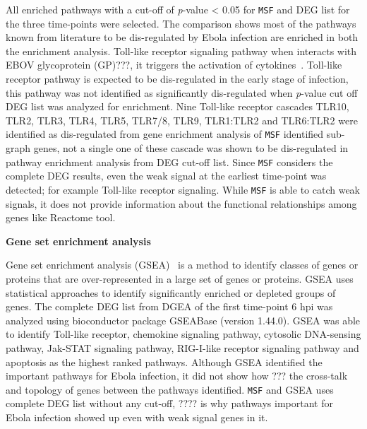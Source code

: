 \documentclass[10pt,a4paper,twocolumn]{article}
\newcommand{\TODO}[1]{\begingroup\color{red}#1\endgroup}
\begin{document}
	All enriched pathways with a cut-off of \textit{p}-value <
        0.05 for \texttt{MSF} and DEG list for the three time-points
        were selected. The comparison shows most of the pathways known
        from literature to be dis-regulated by Ebola infection are
        enriched in both the enrichment analysis. Toll-like receptor
        signaling pathway when interacts with EBOV glycoprotein (GP)\TODO{???},
        it triggers the activation of
        cytokines~\cite{Olejnik}. Toll-like receptor pathway is
        expected to be dis-regulated in the early stage of infection,
        this pathway was not identified as significantly dis-regulated
        when \textit{p}-value cut off DEG list was analyzed for
        enrichment. Nine Toll-like receptor cascades TLR10, TLR2,
        TLR3, TLR4, TLR5, TLR7/8, TLR9, TLR1:TLR2 and TLR6:TLR2 were
        identified as dis-regulated from gene enrichment analysis of
        \texttt{MSF} identified sub-graph genes, not a single one of
        these cascade was shown to be dis-regulated in pathway
        enrichment analysis from DEG cut-off list. Since \texttt{MSF}
        considers the complete DEG results, even the weak signal at
        the earliest time-point was detected; for example Toll-like
        receptor signaling. While \texttt{MSF} is able to catch weak
        signals, it does not provide information about the functional
        relationships among genes like Reactome tool.
	
	\textbf{Gene set enrichment analysis }
	
	Gene set enrichment analysis (GSEA)~\cite{Subramanian15545}
        is a method to identify
        classes of genes or proteins that are over-represented in a
        large set of genes or proteins. GSEA uses statistical
        approaches to identify significantly enriched or depleted
        groups of genes. The complete DEG list from DGEA of the first
        time-point 6 hpi was analyzed using bioconductor package
        GSEABase (version 1.44.0). GSEA was able to identify
        Toll-like receptor, chemokine signaling pathway,
        cytosolic DNA-sensing pathway, Jak-STAT signaling pathway,
        RIG-I-like receptor signaling pathway and apoptosis as the
        highest ranked pathways. Although GSEA identified the
        important pathways for Ebola infection, it did not show how \TODO{???}
        the cross-talk and topology of genes between the pathways
        identified. \texttt{MSF} and GSEA uses complete DEG list
        without any cut-off, \TODO{????} is why pathways important for Ebola
        infection showed up even with weak signal genes in it.
	
\end{document}
